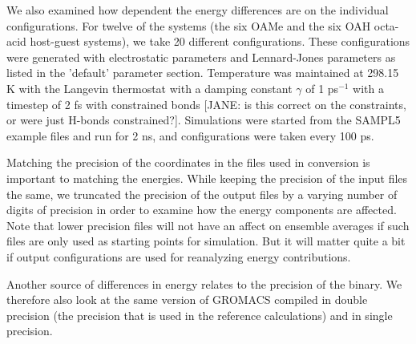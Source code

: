 We also examined how dependent the energy differences are on the
individual configurations. For twelve of the systems (the six OAMe and
the six OAH octa-acid host-guest systems), we take 20 different
configurations. These configurations were generated with electrostatic
parameters and Lennard-Jones parameters as listed in the 'default'
parameter section. Temperature was maintained at 298.15 K with the
Langevin thermostat with a damping constant $\gamma$ of 1 ps$^{-1}$
with a timestep of 2 fs with constrained bonds [JANE: is this correct
  on the constraints, or were just H-bonds constrained?]. Simulations
were started from the SAMPL5 example files and run for 2 ns, and
configurations were taken every 100 ps.

Matching the precision of the coordinates in the files used in
conversion is important to matching the energies. While keeping the
precision of the input files the same, we truncated the precision of
the output files by a varying number of digits of precision in order
to examine how the energy components are affected. Note that lower
precision files will not have an affect on ensemble averages if such
files are only used as starting points for simulation. But it will
matter quite a bit if output configurations are used for reanalyzing
energy contributions.

Another source of differences in energy relates to the precision of
the binary.  We therefore also look at the same version of GROMACS
compiled in double precision (the precision that is used in the
reference calculations) and in single precision.  


